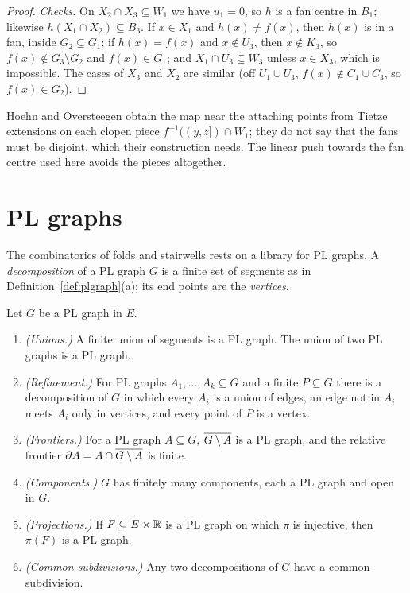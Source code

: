 \begin{proof}
\emph{Checks.} On $X_2\cap X_3\subseteq W_1$ we have $u_1=0$, so $h$ is a fan centre in $B_1$; likewise $h(X_1\cap X_2)\subseteq B_3$. If $x\in X_1$ and $h(x)\ne f(x)$,
then $h(x)$ is in a fan, inside $G_2\subseteq G_1$; if $h(x)=f(x)$ and $x\notin U_3$, then $x\notin K_3$, so $f(x)\notin G_3\setminus G_2$ and $f(x)\in G_1$; and
$X_1\cap U_3\subseteq W_3$ unless $x\in X_3$, which is impossible. The cases of $X_3$ and $X_2$ are similar (off $U_1\cup U_3$, $f(x)\notin C_1\cup C_3$, so $f(x)\in G_2$).
\end{proof}


Hoehn and Oversteegen obtain the map near the attaching points from Tietze extensions on each clopen piece $f^{-1}((y,z])\cap W_1$; they do not say that
the fans must be disjoint, which their construction needs. The linear push towards the fan centre used here avoids the pieces altogether.

\section{PL graphs}

The combinatorics of folds and stairwells rests on a library for PL graphs. A \emph{decomposition} of a PL graph $G$ is a finite set of segments as in
Definition~\ref{def:plgraph}(a); its end points are the \emph{vertices}.

\begin{proposition}\label{prop:pl-library}
Let $G$ be a PL graph in $E$.
\begin{enumerate}[label=(\alph*)]
\item \emph{(Unions.)} A finite union of segments is a PL graph. The union of two PL graphs is a PL graph.
\item \emph{(Refinement.)} For PL graphs $A_1,\dots,A_k\subseteq G$ and a finite $P\subseteq G$ there is a decomposition of $G$ in which every $A_i$ is a union of
edges, an edge not in $A_i$ meets $A_i$ only in vertices, and every point of $P$ is a vertex.
\item \emph{(Frontiers.)} For a PL graph $A\subseteq G$, $\overline{G\setminus A}$ is a PL graph, and the relative frontier $\partial A=A\cap\overline{G\setminus A}$ is finite.
\item \emph{(Components.)} $G$ has finitely many components, each a PL graph and open in $G$.
\item \emph{(Projections.)} If $F\subseteq E\times\mathbb{R}$ is a PL graph on which $\pi$ is injective, then $\pi(F)$ is a PL graph.
\item \emph{(Common subdivisions.)} Any two decompositions of $G$ have a common subdivision.
\end{enumerate}
\end{proposition}

